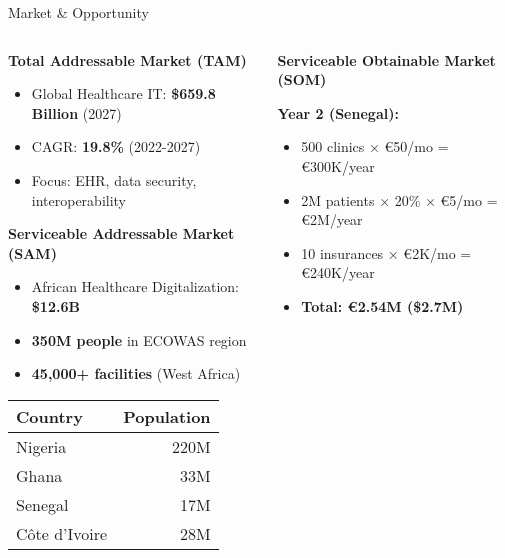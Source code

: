 \documentclass[aspectratio=169,xcolor=dvipsnames,14pt]{beamer}
\begin{document}
\begin{frame}{Market \& Opportunity}

  \begin{columns}[T]
    \begin{column}{0.5\textwidth}
      \textbf{\textcolor{FadjmaBlue}{Total Addressable Market (TAM)}}
      \begin{itemize}
        \item Global Healthcare IT: \textbf{\$659.8 Billion} (2027)
        \item CAGR: \textbf{19.8\%} (2022-2027)
        \item Focus: EHR, data security, interoperability
      \end{itemize}

      \vspace{0.3cm}

      \textbf{\textcolor{FadjmaBlue}{Serviceable Addressable Market (SAM)}}
      \begin{itemize}
        \item African Healthcare Digitalization: \textbf{\$12.6B}
        \item \textbf{350M people} in ECOWAS region
        \item \textbf{45,000+ facilities} (West Africa)
      \end{itemize}

      \begin{table}
        \scriptsize
        \begin{tabular}{lr}
          \toprule
          \textbf{Country} & \textbf{Population} \\
          \midrule
          Nigeria & 220M \\
          Ghana & 33M \\
          Senegal & 17M \\
          Côte d'Ivoire & 28M \\
          \bottomrule
        \end{tabular}
      \end{table}
    \end{column}

    \begin{column}{0.5\textwidth}
      \textbf{\textcolor{FadjmaBlue}{Serviceable Obtainable Market (SOM)}}

      \textbf{Year 2 (Senegal):}
      \begin{itemize}
        \item 500 clinics × €50/mo = €300K/year
        \item 2M patients × 20\% × €5/mo = €2M/year
        \item 10 insurances × €2K/mo = €240K/year
        \item \textbf{Total: €2.54M (\$2.7M)}
      \end{itemize}


\end{column}
\end{columns}
\end{frame}
\end{document}
